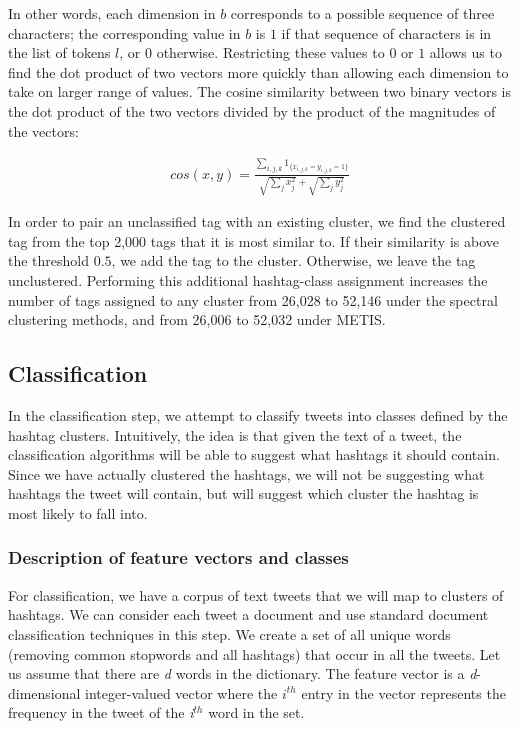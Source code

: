 In other words, each dimension in $b$ corresponds to a possible sequence of three characters; the corresponding value in $b$ is $1$ if that sequence of characters is in the list of tokens $l$, or $0$ otherwise. Restricting these values to $0$ or $1$ allows us to find the dot product of two vectors more quickly than allowing each dimension to take on  larger range of values. The cosine similarity between two binary vectors is the dot product of the two vectors divided by the product of the magnitudes of the vectors:

\begin{eqnarray}
cos(x, y) = \frac{ \sum_{i,j,k} 1_{\{ x_{i,j,k} = y_{i,j,k} = 1 \}} }{  \sqrt{\sum_j x_j^2} + \sqrt{ \sum_j y_j^2 }  } \nonumber
\end{eqnarray}

In order to pair an unclassified tag with an existing cluster, we find the clustered tag from the top 2,000 tags that it is most similar to. If their similarity is above the threshold $0.5$, we add the tag to the cluster. Otherwise, we leave the tag unclustered. Performing this additional hashtag-class assignment increases the number of tags assigned to any cluster from 26,028 to 52,146 under the spectral clustering methods, and from 26,006 to 52,032 under METIS.

\subsection{Classification}
\setcounter{secnumdepth}{4}

In the classification step, we attempt to classify tweets into classes defined by the hashtag clusters. Intuitively, the idea is that given the text of a tweet, the classification algorithms will be able to suggest what hashtags it should contain. Since we have actually clustered the hashtags, we will not be suggesting what hashtags the tweet will contain, but will suggest which cluster the hashtag is most likely to fall into.  

\subsubsection{Description of feature vectors and classes}
For classification, we have a corpus of text tweets that we will map to clusters of hashtags. We can consider each tweet a document and use standard document classification techniques in this step. We create a set of all unique words (removing common stopwords and all hashtags) that occur in all the tweets. Let us assume that there are {\it d} words in the dictionary.  
The feature vector is a {\it d}-dimensional integer-valued vector where the {\it $i^{th}$} entry in the vector represents the frequency in the tweet of the {\it i$^{th}$} word in the set.


